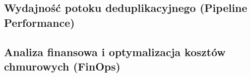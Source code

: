 \subsection{Wydajność potoku deduplikacyjnego (Pipeline Performance)}
\label{sec:wydajonsc-potoku}


\subsection{Analiza finansowa i optymalizacja kosztów chmurowych (FinOps)}
\label{sec:analiza-finops}

